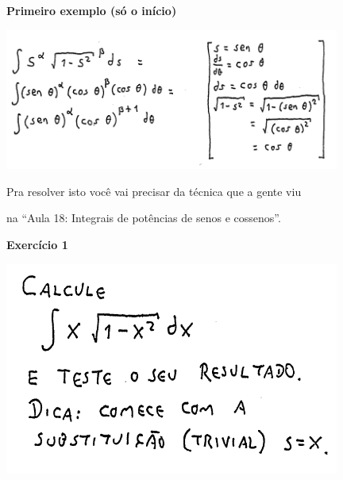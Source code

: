 \documentclass[oneside,12pt]{article}
\begin{document}


{\bf Primeiro exemplo (só o início)}

\includegraphics[width=11cm]{2020-1-C2/20201125_160341_substituicao_s.pdf}

Pra resolver isto você vai precisar da técnica que a gente viu

na ``Aula 18: Integrais de potências de senos e cossenos''.



\newpage


{\bf Exercício 1}

\includegraphics[width=11cm]{2020-1-C2/20201125_160159_exerc_1.pdf}

\end{document}

